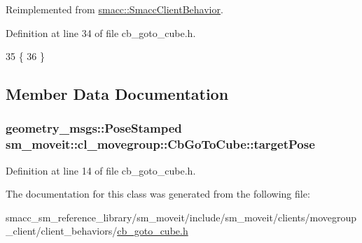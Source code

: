 Reimplemented from \hyperlink{classsmacc_1_1SmaccClientBehavior_ac0cd72d42bd00425362a97c9803ecce5}{smacc\+::\+Smacc\+Client\+Behavior}.



Definition at line 34 of file cb\+\_\+goto\+\_\+cube.\+h.


\begin{DoxyCode}
35   \{
36   \}
\end{DoxyCode}


\subsection{Member Data Documentation}
\subsubsection[{\texorpdfstring{target\+Pose}{targetPose}}]{\setlength{\rightskip}{0pt plus 5cm}geometry\+\_\+msgs\+::\+Pose\+Stamped sm\+\_\+moveit\+::cl\+\_\+movegroup\+::\+Cb\+Go\+To\+Cube\+::target\+Pose}\hypertarget{classsm__moveit_1_1cl__movegroup_1_1CbGoToCube_a3b670d6c066bdcdcb53906e281a5a183}{}\label{classsm__moveit_1_1cl__movegroup_1_1CbGoToCube_a3b670d6c066bdcdcb53906e281a5a183}


Definition at line 14 of file cb\+\_\+goto\+\_\+cube.\+h.



The documentation for this class was generated from the following file\+:\begin{DoxyCompactItemize}
\item 
smacc\+\_\+sm\+\_\+reference\+\_\+library/sm\+\_\+moveit/include/sm\+\_\+moveit/clients/movegroup\+\_\+client/client\+\_\+behaviors/\hyperlink{cb__goto__cube_8h}{cb\+\_\+goto\+\_\+cube.\+h}\end{DoxyCompactItemize}
